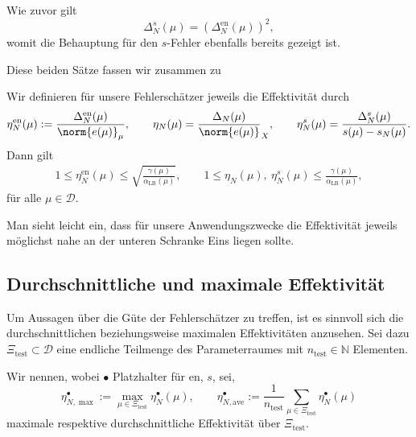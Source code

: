 \begin{Satz}
\begin{Beweis}
        Wie zuvor gilt
        \begin{equation}
            \Delta^s_N(\mu) = \left( \Delta^{\text{en}}_N(\mu) \right)^2,
        \end{equation}
        womit die Behauptung für den $s$-Fehler ebenfalls bereits gezeigt ist.
    \end{Beweis}
\end{Satz}

Diese beiden Sätze fassen wir zusammen zu

\begin{Korollar}
    \label{korollar:effektivitaeten}
    Wir definieren für unsere Fehlerschätzer jeweils die Effektivität durch
    \begin{equation}
        \eta^{\text{en}}_N(\mu) := \frac{\Delta^{\text{en}}_N(\mu)}{\norm{e(\mu)}_{\mu}}
        , \qquad
        \eta_N(\mu) = \frac{\Delta_N(\mu)}{\norm{e(\mu)}}_X
        , \qquad
        \eta^{s}_N(\mu) = \frac{\Delta^s_N(\mu)}{s(\mu) - s_N(\mu)}.
    \end{equation}
    Dann gilt
    \begin{align}
        1 \leq \eta^{\text{en}}_N(\mu) \leq \sqrt{\frac{\gamma(\mu)}{\alpha_{\text{LB}}(\mu)}}, \qquad
        1 \leq \eta_N(\mu),~\eta^{s}_N(\mu) \leq \frac{\gamma(\mu)}{\alpha_{\text{LB}}(\mu)},
    \end{align}
    für alle $\mu \in \mathcal D$.
\end{Korollar}
Man sieht leicht ein, dass für unsere Anwendungszwecke die Effektivität jeweils möglichst nahe an der unteren Schranke Eins liegen sollte.

\subsection{Durchschnittliche und maximale Effektivität} %
\label{sub:durchschnittliche_und_maximale_effektivitaet}

Um Aussagen über die Güte der Fehlerschätzer zu treffen, ist es sinnvoll sich die durchschnittlichen beziehungsweise maximalen Effektivitäten anzusehen.
Sei dazu $\Xi_{\text{test}} \subset \mathcal D$ eine endliche Teilmenge des Parameterraumes mit $n_\text{test} \in \mathbb{N}$ Elementen.

Wir nennen, wobei $\bullet$ Platzhalter für \glqq{}$\text{en}$\grqq{}, \glqq{}$s$\grqq{}, \glqq{} \grqq{} sei,
\begin{equation}
    \eta^\bullet_{N,\max} := \max_{\mu \in \Xi_\text{test}} \eta^\bullet_N(\mu), \qquad
    \eta^\bullet_{N,\text{ave}} := \frac{1}{n_\text{test}} \sum_{\mu \in \Xi_\text{test}} \eta^\bullet_N(\mu)
\end{equation}
maximale respektive durchschnittliche Effektivität über $\Xi_\text{test}$.

